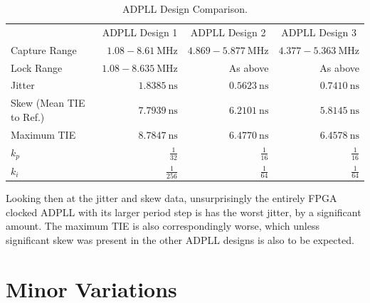\begin{table}[]
    \begin{centre}
        \begin{tabular}{lrrr}
        \multicolumn{1}{c}{}          & \multicolumn{1}{c}{ADPLL Design 1}  & \multicolumn{1}{c}{ADPLL Design 2} & \multicolumn{1}{c}{ADPLL Design 3} \\ \cline{2-4}       
        Capture Range                 & $1.08-8.61~\si{\mega\hertz}$       & $4.869-5.877~\si{\mega\hertz}$    & $4.377-5.363~\si{\mega\hertz}$       \\
        Lock Range                    & $1.08-8.635~\si{\mega\hertz}$      & As above                           & As above                            \\
        Jitter                        & $1.8385~\si{\nano\second}$         & $0.5623~\si{\nano\second}$         & $0.7410~\si{\nano\second}$          \\
        Skew (Mean \acs{TIE} to Ref.) & $7.7939~\si{\nano\second}$         & $6.2101~\si{\nano\second}$         & $5.8145~\si{\nano\second}$          \\
        Maximum \acs{TIE}             & $8.7847~\si{\nano\second}$         & $6.4770~\si{\nano\second}$         & $6.4578~\si{\nano\second}$          \\
        $k_p$                         & $\frac{1}{32}$                     & $\frac{1}{16}$                     & $\frac{1}{16}$                      \\
        $k_i$                         & $\frac{1}{256}$                    & $\frac{1}{64}$                     & $\frac{1}{64}$  
        \end{tabular}
    \end{centre}
    \caption[\ac{ADPLL} Design Comparison]{\ac{ADPLL} Design Comparison.}
    \label{table:characterisation}
\end{table}

Looking then at the jitter and skew data, unsurprisingly the entirely \ac{FPGA} clocked \ac{ADPLL} with its larger period step is has the worst jitter, by a significant amount. The maximum \ac{TIE} is also correspondingly worse, which unless significant skew was present in the other \ac{ADPLL} designs is also to be expected.


\section{Minor Variations}\label{section:minor_variations}

